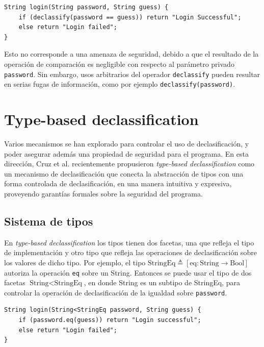 \clearpage

\begin{lstlisting}
String login(String password, String guess) {
	if (declassify(password == guess)) return "Login Successful";
	else return "Login failed";
}
\end{lstlisting}

	Esto no corresponde a una amenaza de seguridad, debido a que el resultado de la operación de comparación es negligible con respecto al parámetro privado \texttt{password}. Sin embargo, usos arbitrarios del operador \texttt{declassify} pueden resultar en serias fugas de información, como por ejemplo \texttt{declassify(password)}.

	\section{Type-based declassification}

	Varios mecanismos se han explorado para controlar el uso de declasificación, y poder asegurar además una propiedad de seguridad para el programa\cite{sabelfeldSands:JCS09}. En esta dirección, Cruz et al.\cite{cruzAl:ecoop2017} recientemente propusieron \textit{type-based declassification} como un mecanismo de declasificación que conecta la abstracción de tipos con una forma controlada de declasificación, en una manera intuitiva y expresiva, proveyendo garantías formales sobre la seguridad del programa. %

	\subsection{Sistema de tipos}

	En \textit{type-based declassification} los tipos tienen dos facetas, una que refleja el tipo de implementación y otro tipo que refleja las operaciones de declasificación sobre los valores de dicho tipo. Por ejemplo, el tipo $\text{StringEq} \triangleq [\text{eq} : \text{String} \rightarrow \text{Bool}]$ autoriza la operación \texttt{eq} sobre un String. Entonces se puede usar el tipo de dos facetas $\text{String} < \text{StringEq}$, en donde String es un subtipo de StringEq, para controlar la operación de declasificación de la igualdad sobre \texttt{password}.

	\begin{lstlisting}
String login(String<StringEq password, String guess) {
	if (password.eq(guess)) return "Login successful";
	else return "Login failed";
}
	\end{lstlisting}

